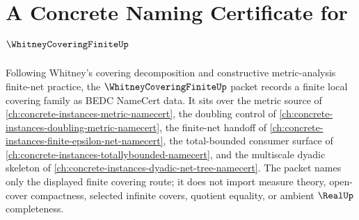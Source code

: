 \chapter{A Concrete Naming Certificate for $\WhitneyCoveringFiniteUp$}
\label{ch:concrete-instances-whitney-covering-finite-namecert}

Following Whitney's covering decomposition and constructive metric-analysis finite-net practice, the $\WhitneyCoveringFiniteUp$ packet records a finite local covering family as BEDC NameCert data. It sits over the metric source of \autoref{ch:concrete-instances-metric-namecert}, the doubling control of \autoref{ch:concrete-instances-doubling-metric-namecert}, the finite-net handoff of \autoref{ch:concrete-instances-finite-epsilon-net-namecert}, the total-bounded consumer surface of \autoref{ch:concrete-instances-totallybounded-namecert}, and the multiscale dyadic skeleton of \autoref{ch:concrete-instances-dyadic-net-tree-namecert}. The packet names only the displayed finite covering route; it does not import measure theory, open-cover compactness, selected infinite covers, quotient equality, or ambient $\RealUp$ completeness.

